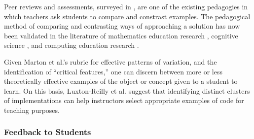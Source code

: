\documentclass[12pt]{article}
\begin{document}
Peer reviews and assessments, surveyed in \cite{peerReview98}, are one of the existing pedagogies in which teachers ask students to compare and constrast examples. The pedagogical method of comparing and contrasting ways of approaching a solution has now been validated in the literature of mathematics education research \cite{Star07}, cognitive science \cite{loewenstein2003analogical,kurtz01learning,telling}, and computing education research \cite{Suhonen08, PatitsasICER13}.

Given Marton et al.'s rubric for effective patterns of variation, and the identification of ``critical features,'' one can discern between more or less theoretically effective examples of the object or concept given to a student to learn. On this basis, Luxton-Reilly et al. \cite{Luxton13} suggest that identifying distinct clusters of implementations can help instructors select appropriate examples of code for teaching purposes.



%
%
%

\subsubsection{Feedback to Students}
\end{document}

